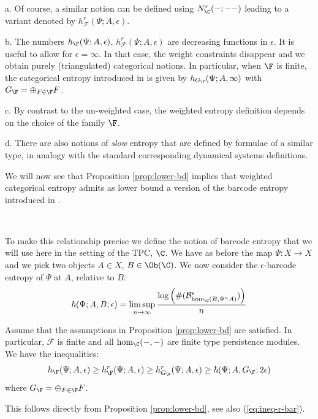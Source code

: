 \begin{rem}\label{rem:variants_ent}
a. Of course, a similar notion can be defined using $N_{\C}^{r}(-;--)$ leading to a variant denoted by $h_{\mathcal{F}}^{r}(\Psi; A,\epsilon)$.

b. The numbers $h_{\F}(\Psi;A,\epsilon)$, $h_{\mathcal{F}}^{r}(\Psi; A,\epsilon)$  are decreasing functions in $\epsilon$. It is useful to allow for $\epsilon=\infty$. In that case, the weight constraints disappear and we obtain purely (triangulated) categorical notions. In particular,  when $\F$ is finite, the categorical entropy introduced in \cite{DHKK:dyn_cat}  
is given by  $h_{G_{\F}}(\Psi;A,\infty)$ with $G_{\F}=\oplus_{F\in\F}F$. 

c. By contrast to the un-weighted case, the weighted entropy definition depends on the choice of the family $\F$. 

d. There are also notions of {\em slow} entropy that are defined by formulae of a similar type, in analogy with the standard corresponding dynamical systems definitions. 
\end{rem}

We will now see that Proposition \ref{prop:lower-bd} implies that weighted categorical entropy  admits as lower bound a version of the barcode entropy introduced in \cite{CGG_bar_ent}.

\

To make this relationship precise we define the notion of barcode entropy that we will use here in the setting
of the TPC, $\C$.  We have as before the map $\Psi:X\to X$ and we pick two objects $A \in X$, $B\in \Ob(\C)$. We now consider the 
$\epsilon$-barcode entropy of $\Psi$ at $A$, relative to $B$:
\begin{equation}\label{eq:bar-code_ent}
\hbar(\Psi; A, B;\epsilon)=\limsup_{n\to \infty}\frac{\log\left( \# (\mathcal{B}^{\epsilon}_{\hom_{\C}(B,\Psi^{n}A)})\right)}{n}
\end{equation} 


\begin{cor}\label{cor:entr_rel} Assume that the assumptions in Proposition \ref{prop:lower-bd} are satisfied. In particular,  $\mathcal{F}$ is finite and all $\hom_{\C}(-,-)$ are finite type persistence modules.
We have the inequalities:
$$
h_{\F}(\Psi; A,\epsilon)\geq h^{r}_{\F}(\Psi; A,\epsilon) \geq  h_{G_{\F}}^{r}(\Psi; A,\epsilon)\geq \hbar(\Psi; A, G_{\F};2\epsilon)
$$
where $G_{\F}=\oplus_{F\in\F} F$.
\end{cor}

This follows directly from Proposition \ref{prop:lower-bd}, see also (\ref{eq:ineq-r-bar}).



